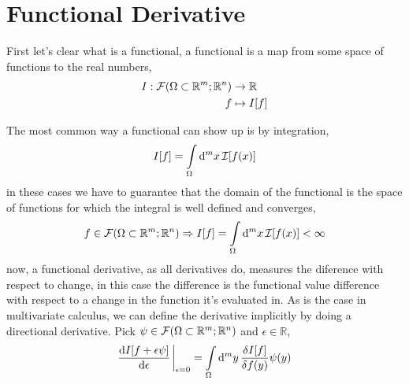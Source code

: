 \section{Functional Derivative}

First let's clear what is a functional, a functional is a map from some space of functions to the real numbers, 
\begin{align}
    I:\mathcal F\qty(\Omega\subset \mathbb R^m;\mathbb R^n)&\rightarrow\mathbb R\\
    f&\mapsto I\qty[f]
\end{align}

The most common way a functional can show up is by integration,
\begin{align}
    I[f]=\int\limits_{\Omega}\dd[m]{x}\mathcal I\qty[f(x)]
\end{align}
in these cases we have to guarantee that the domain of the functional is the space of functions for which the integral is well defined and converges,
\begin{align}
    f\in \mathcal F\qty(\Omega\subset \mathbb R^m;\mathbb R^n)\Rightarrow I[f]=\int\limits_{\Omega}\dd[m]{x}\mathcal I\qty[f(x)]<\infty
\end{align}
now, a functional derivative, as all derivatives do, measures the diference with respect to change, in this case the difference is the functional 
value difference with respect to a change in the function it's evaluated in. As is the case in multivariate calculus, we can define the derivative 
implicitly by doing a directional derivative. Pick $\psi\in \mathcal F\qty(\Omega\subset \mathbb R^m;\mathbb R^n)$ and $\epsilon\in\mathbb R$,
\begin{align}
    \dv{I[f+\epsilon \psi]}{\epsilon}\eval_{\epsilon=0} = \int\limits_\Omega\dd[m]{y}\fdv{I[f]}{f(y)}\psi(y)
\end{align}